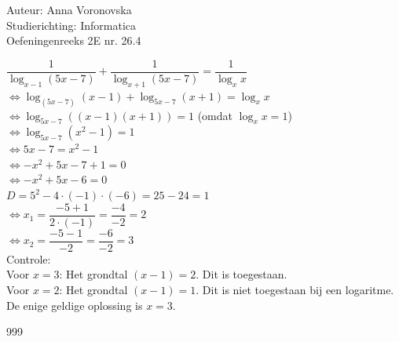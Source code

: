 \documentclass[a4paper]{article}
\begin{document}
  
\noindent \large Auteur: Anna Voronovska \\
\noindent \large Studierichting: Informatica\\
\noindent \large Oefeningenreeks 2E nr. 26.4\\

\medskip

\normalsize

$\dfrac{1}{\log_{x-1} (5x-7)} + \dfrac{1}{\log_{x+1} (5x-7)} = \dfrac{1}{\log_{x} x}$ \\

$\Leftrightarrow \log_{(5x-7)} (x-1) + \log_{5x-7} (x+1) = \log_x x$ \\

$\Leftrightarrow \log_{5x-7} ((x-1)(x+1)) = 1$  (omdat $\log_x x = 1$)\\


$\Leftrightarrow \log_{5x-7} (x^2 - 1) = 1$ \\

$\Leftrightarrow 5x - 7 = x^2 - 1$ \\

$\Leftrightarrow -x^2 + 5x - 7 + 1 = 0$ \\

$\Leftrightarrow -x^2 + 5x - 6 = 0$ \\

$D = 5^2 - 4 \cdot (-1) \cdot (-6) = 25 - 24 = 1$ \\

$\Leftrightarrow x_1 = \dfrac{-5+1}{2 \cdot (-1)} = \dfrac{-4}{-2} = 2$ \\

$\Leftrightarrow x_2 = \dfrac{-5-1}{-2} = \dfrac{-6}{-2} = 3$\\

Controle:\\

Voor $x = 3$: Het grondtal $(x-1) = 2$. Dit is toegestaan. \\

Voor $x = 2$: Het grondtal $(x-1) = 1$. Dit is niet toegestaan bij een logaritme. \\

De enige geldige oplossing is $x = 3$. \\



\begin{thebibliography}{999}
\end{thebibliography}
\end{document}
